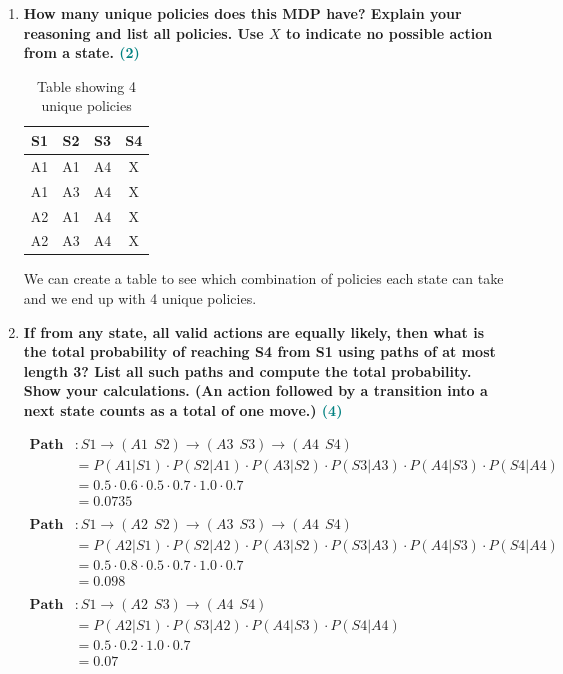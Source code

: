 \documentclass[a4paper]{article}
\begin{document}
\begin{sloppypar}
\begin{enumerate}[start=8,label=Q\arabic*,left=0pt]
    \item \textbf{How many unique policies does this MDP have? Explain your reasoning and list all policies. Use $X$ to indicate no possible action from a state. \hfill \textcolor{teal}{(2)}}
    
    \begin{table}[h!]
    \centering
    \begin{tabular}{ |c|c|c|c| } 
        \hline
        S1 & S2 & S3 & S4 \\
        \hline
        A1 & A1 & A4 & X \\ 
        A1 & A3 & A4 & X \\ 
        A2 & A1 & A4 & X \\ 
        A2 & A3 & A4 & X \\ 
        \hline
    \end{tabular}
    \caption{Table showing 4 unique policies}
    \label{table:1}
    \end{table}

    We can create a table to see which combination of policies each state can take and we end up
    with 4 unique policies.
    
    \item \textbf{If from any state, all valid actions are equally likely, then what is the total probability
    of reaching S4 from S1 using paths of at most length 3? List all such paths and compute
    the total probability. Show your calculations. (An action followed by a transition into a next
    state counts as a total of one move.) \hfill \textcolor{teal}{(4)}}
    
    \begin{align*}
        \textbf{Path 1}&: S1 \rightarrow (A1 \:\: S2) \rightarrow (A3 \:\: S3) \rightarrow (A4 \:\: S4) \\
        &= P(A1 | S1) \cdot P(S2 | A1) \cdot P(A3 | S2) \cdot P(S3 | A3) \cdot P(A4 | S3) \cdot P(S4 | A4) \\
        &= 0.5 \cdot 0.6 \cdot 0.5 \cdot 0.7 \cdot 1.0 \cdot 0.7 \\
        &= 0.0735 \\\\
        \textbf{Path 2}&: S1 \rightarrow (A2 \:\: S2) \rightarrow (A3 \:\: S3) \rightarrow (A4 \:\: S4) \\
        &= P(A2 | S1) \cdot P(S2 | A2) \cdot P(A3 | S2) \cdot P(S3 | A3) \cdot P(A4 | S3) \cdot P(S4 | A4) \\
        &= 0.5 \cdot 0.8 \cdot 0.5 \cdot 0.7 \cdot 1.0 \cdot 0.7 \\
        &=  0.098 \\\\
        \textbf{Path 3}&: S1 \rightarrow (A2 \:\: S3) \rightarrow (A4 \:\: S4) \\
        &= P(A2 | S1) \cdot P(S3 | A2) \cdot P(A4 | S3) \cdot P(S4 | A4) \\
        &= 0.5 \cdot 0.2 \cdot 1.0 \cdot 0.7 \\
        &= 0.07
    \end{align*}


\end{enumerate}
\end{sloppypar}
\end{document}
